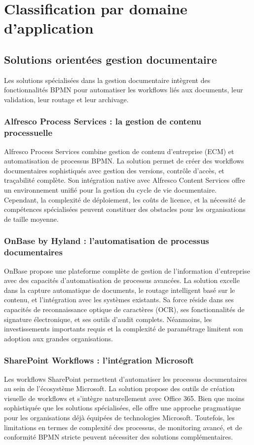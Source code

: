 \section{Classification par domaine d'application}

\subsection{Solutions orientées gestion documentaire}

Les solutions spécialisées dans la gestion documentaire intègrent des fonctionnalités BPMN pour automatiser les workflows liés aux documents, leur validation, leur routage et leur archivage.

\subsubsection{Alfresco Process Services : la gestion de contenu processuelle}
Alfresco Process Services combine gestion de contenu d'entreprise (ECM) et automatisation de processus BPMN. La solution permet de créer des workflows documentaires sophistiqués avec gestion des versions, contrôle d'accès, et traçabilité complète. Son intégration native avec Alfresco Content Services offre un environnement unifié pour la gestion du cycle de vie documentaire. Cependant, la complexité de déploiement, les coûts de licence, et la nécessité de compétences spécialisées peuvent constituer des obstacles pour les organisations de taille moyenne.

\subsubsection{OnBase by Hyland : l'automatisation de processus documentaires}
OnBase propose une plateforme complète de gestion de l'information d'entreprise avec des capacités d'automatisation de processus avancées. La solution excelle dans la capture automatique de documents, le routage intelligent basé sur le contenu, et l'intégration avec les systèmes existants. Sa force réside dans ses capacités de reconnaissance optique de caractères (OCR), ses fonctionnalités de signature électronique, et ses outils d'audit complets. Néanmoins, les investissements importants requis et la complexité de paramétrage limitent son adoption aux grandes organisations.

\subsubsection{SharePoint Workflows : l'intégration Microsoft}
Les workflows SharePoint permettent d'automatiser les processus documentaires au sein de l'écosystème Microsoft. La solution propose des outils de création visuelle de workflows et s'intègre naturellement avec Office 365. Bien que moins sophistiquée que les solutions spécialisées, elle offre une approche pragmatique pour les organisations déjà équipées de technologies Microsoft. Toutefois, les limitations en termes de complexité des processus, de monitoring avancé, et de conformité BPMN stricte peuvent nécessiter des solutions complémentaires.

